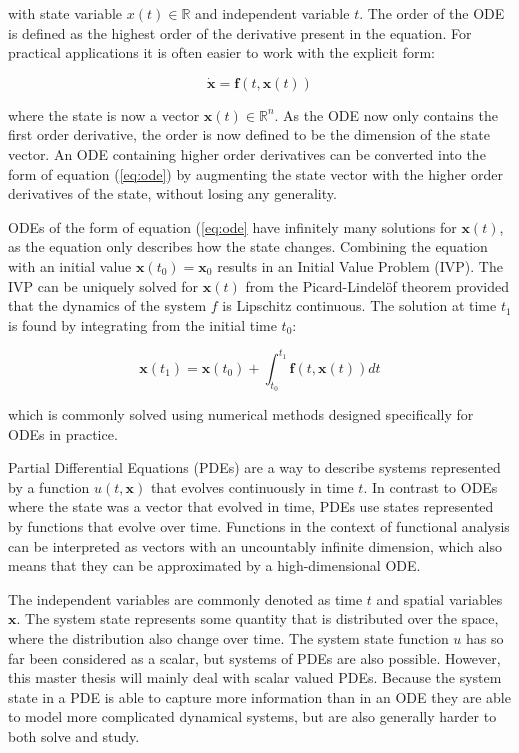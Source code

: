 \noindent with state variable $x(t) \in \mathbb{R}$ and independent variable $t$. The order of the ODE is defined as the highest order of the derivative present in the equation. For practical applications it is often easier to work with the explicit form:

\begin{equation}
    \dot{\bm{x}} = \bm{f}(t, \bm{x}(t))
    \label{eq:ode}
\end{equation}

\noindent where the state is now a vector $\bm{x}(t) \in \mathbb{R}^n$. As the ODE now only contains the first order derivative, the order is now defined to be the dimension of the state vector. An ODE containing higher order derivatives can be converted into the form of equation (\ref{eq:ode}) by augmenting the state vector with the higher order derivatives of the state, without losing any generality.

ODEs of the form of equation (\ref{eq:ode} have infinitely many solutions for $\bm{x}(t)$, as the equation only describes how the state changes. Combining the equation with an initial value $\bm{x}(t_0) = \bm{x}_0$ results in an Initial Value Problem (IVP).  The IVP can be uniquely solved for $\bm{x}(t)$ from the Picard-Lindelöf theorem \cite{kreyszigfunctional} provided that the dynamics of the system $f$ is Lipschitz continuous. The solution at time $t_1$ is found by integrating from the initial time $t_0$:

\begin{equation}
    \bm{x}(t_1) = \bm{x}(t_0) + \int_{t_0}^{t_1} \bm{f}(t, \bm{x}(t)) dt
    \label{eq:ode_solution}
\end{equation}

\noindent which is commonly solved using numerical methods designed specifically for ODEs in practice.

Partial Differential Equations (PDEs) are a way to describe systems represented by a function $u(t, \bm{x})$ that evolves continuously in time $t$. In contrast to ODEs where the state was a vector that evolved in time, PDEs use states represented by functions that evolve over time. Functions in the context of functional analysis can be interpreted as vectors with an uncountably infinite dimension, which also means that they can be approximated by a high-dimensional ODE.

The independent variables are commonly denoted as time $t$ and spatial variables $\bm{x}$. The system state represents some quantity that is distributed over the space, where the distribution also change over time. The system state function $u$ has so far been considered as a scalar, but systems of PDEs are also possible. However, this master thesis will mainly deal with scalar valued PDEs. Because the system state in a PDE is able to capture more information than in an ODE they are able to model more complicated dynamical systems, but are also generally harder to both solve and study.

